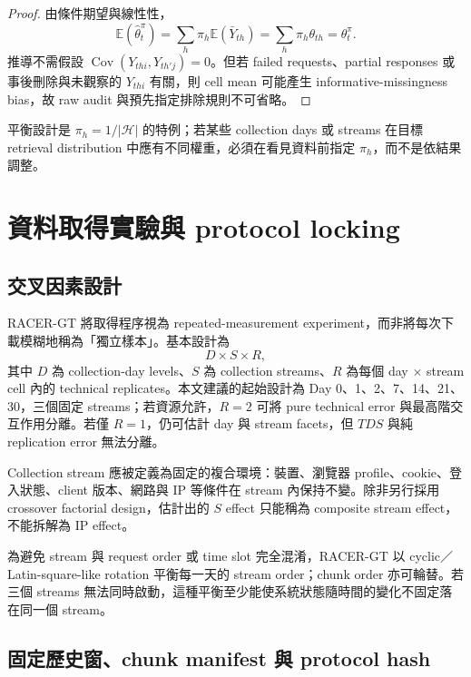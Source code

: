 \documentclass[12pt,a4paper,oneside]{article}
\newcommand{\E}{\mathbb{E}}
\newcommand{\Cov}{\operatorname{Cov}}
\begin{document}
\begin{proof}
由條件期望與線性性，
\[
\E(\widehat\theta_t^{\pi})
=\sum_h\pi_h\E(\bar Y_{th})
=\sum_h\pi_h\theta_{th}
=\theta_t^{\pi}.
\]
推導不需假設 $\Cov(Y_{thi},Y_{th'j})=0$。但若 failed requests、partial responses 或事後刪除與未觀察的 $Y_{thi}$ 有關，則 cell mean 可能產生 informative-missingness bias，故 raw audit 與預先指定排除規則不可省略。
\end{proof}

平衡設計是 $\pi_h=1/|\mathcal{H}|$ 的特例；若某些 collection days 或 streams 在目標 retrieval distribution 中應有不同權重，必須在看見資料前指定 $\pi_h$，而不是依結果調整。

\section{資料取得實驗與 protocol locking}

\subsection{交叉因素設計}

RACER-GT 將取得程序視為 repeated-measurement experiment，而非將每次下載模糊地稱為「獨立樣本」。基本設計為
\begin{equation}
D\times S\times R,
\end{equation}
其中 $D$ 為 collection-day levels、$S$ 為 collection streams、$R$ 為每個 day $\times$ stream cell 內的 technical replicates。本文建議的起始設計為 Day 0、1、2、7、14、21、30，三個固定 streams；若資源允許，$R=2$ 可將 pure technical error 與最高階交互作用分離。若僅 $R=1$，仍可估計 day 與 stream facets，但 $TDS$ 與純 replication error 無法分離。

Collection stream 應被定義為固定的複合環境：裝置、瀏覽器 profile、cookie、登入狀態、client 版本、網路與 IP 等條件在 stream 內保持不變。除非另行採用 crossover factorial design，估計出的 $S$ effect 只能稱為 composite stream effect，不能拆解為 IP effect。

為避免 stream 與 request order 或 time slot 完全混淆，RACER-GT 以 cyclic／Latin-square-like rotation 平衡每一天的 stream order；chunk order 亦可輪替。若三個 streams 無法同時啟動，這種平衡至少能使系統狀態隨時間的變化不固定落在同一個 stream。

\subsection{固定歷史窗、chunk manifest 與 protocol hash}
\end{document}
